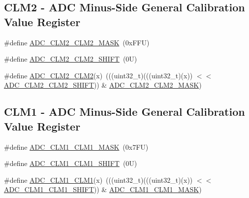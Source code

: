 \subsection*{C\+L\+M2 -\/ A\+DC Minus-\/\+Side General Calibration Value Register}
\begin{DoxyCompactItemize}
\item 
\#define \mbox{\hyperlink{group___a_d_c___register___masks_ga815d6f1bf2d38384c8fd0dd4f07f7a08}{A\+D\+C\+\_\+\+C\+L\+M2\+\_\+\+C\+L\+M2\+\_\+\+M\+A\+SK}}~(0x\+F\+F\+U)
\item 
\#define \mbox{\hyperlink{group___a_d_c___register___masks_ga945ed262c088eecda09d679df33ab193}{A\+D\+C\+\_\+\+C\+L\+M2\+\_\+\+C\+L\+M2\+\_\+\+S\+H\+I\+FT}}~(0\+U)
\item 
\#define \mbox{\hyperlink{group___a_d_c___register___masks_ga2366c7a7142228c95c81d4d11c90b2b1}{A\+D\+C\+\_\+\+C\+L\+M2\+\_\+\+C\+L\+M2}}(x)~(((uint32\+\_\+t)(((uint32\+\_\+t)(x)) $<$$<$ \mbox{\hyperlink{group___a_d_c___register___masks_ga945ed262c088eecda09d679df33ab193}{A\+D\+C\+\_\+\+C\+L\+M2\+\_\+\+C\+L\+M2\+\_\+\+S\+H\+I\+FT}})) \& \mbox{\hyperlink{group___a_d_c___register___masks_ga815d6f1bf2d38384c8fd0dd4f07f7a08}{A\+D\+C\+\_\+\+C\+L\+M2\+\_\+\+C\+L\+M2\+\_\+\+M\+A\+SK}})
\end{DoxyCompactItemize}
\subsection*{C\+L\+M1 -\/ A\+DC Minus-\/\+Side General Calibration Value Register}
\begin{DoxyCompactItemize}
\item 
\#define \mbox{\hyperlink{group___a_d_c___register___masks_gaf576a4eb27b1478ea37a1b35bf6b869f}{A\+D\+C\+\_\+\+C\+L\+M1\+\_\+\+C\+L\+M1\+\_\+\+M\+A\+SK}}~(0x7\+F\+U)
\item 
\#define \mbox{\hyperlink{group___a_d_c___register___masks_gae83765be6a54aab249c89a0f47afb023}{A\+D\+C\+\_\+\+C\+L\+M1\+\_\+\+C\+L\+M1\+\_\+\+S\+H\+I\+FT}}~(0\+U)
\item 
\#define \mbox{\hyperlink{group___a_d_c___register___masks_gac77d03fd2d07583049ec6496092b3a40}{A\+D\+C\+\_\+\+C\+L\+M1\+\_\+\+C\+L\+M1}}(x)~(((uint32\+\_\+t)(((uint32\+\_\+t)(x)) $<$$<$ \mbox{\hyperlink{group___a_d_c___register___masks_gae83765be6a54aab249c89a0f47afb023}{A\+D\+C\+\_\+\+C\+L\+M1\+\_\+\+C\+L\+M1\+\_\+\+S\+H\+I\+FT}})) \& \mbox{\hyperlink{group___a_d_c___register___masks_gaf576a4eb27b1478ea37a1b35bf6b869f}{A\+D\+C\+\_\+\+C\+L\+M1\+\_\+\+C\+L\+M1\+\_\+\+M\+A\+SK}})
\end{DoxyCompactItemize}
